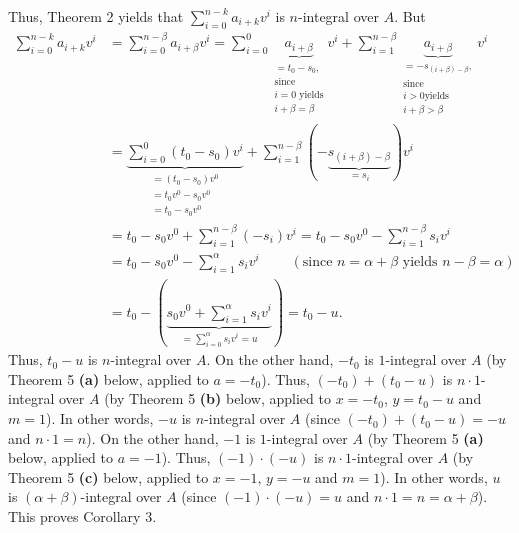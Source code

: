 \documentclass[12pt,final,notitlepage,onecolumn]{article}%
\begin{document}
Thus, Theorem 2 yields that $\sum\limits_{i=0}^{n-k}a_{i+k}v^{i}$ is
$n$-integral over $A$. But%
\begin{align*}
\sum\limits_{i=0}^{n-k}a_{i+k}v^{i}  &  =\sum\limits_{i=0}^{n-\beta}%
a_{i+\beta}v^{i}=\sum\limits_{i=0}^{0}\underbrace{a_{i+\beta}}%
_{\substack{=t_{0}-s_{0},\\\text{since}\\i=0\text{ yields}\\i+\beta=\beta
}}v^{i}+\sum\limits_{i=1}^{n-\beta}\underbrace{a_{i+\beta}}%
_{\substack{=-s_{\left(  i+\beta\right)  -\beta},\\\text{since}\\i>0\text{
yields}\\i+\beta>\beta}}v^{i}\\
&  =\underbrace{\sum\limits_{i=0}^{0}\left(  t_{0}-s_{0}\right)  v^{i}%
}_{\substack{=\left(  t_{0}-s_{0}\right)  v^{0}\\=t_{0}v^{0}-s_{0}%
v^{0}\\=t_{0}-s_{0}v^{0}}}+\sum\limits_{i=1}^{n-\beta}\left(  -\underbrace
{s_{\left(  i+\beta\right)  -\beta}}_{=s_{i}}\right)  v^{i}\\
&  =t_{0}-s_{0}v^{0}+\sum\limits_{i=1}^{n-\beta}\left(  -s_{i}\right)
v^{i}=t_{0}-s_{0}v^{0}-\sum\limits_{i=1}^{n-\beta}s_{i}v^{i}\\
&  =t_{0}-s_{0}v^{0}-\sum\limits_{i=1}^{\alpha}s_{i}v^{i}%
\ \ \ \ \ \ \ \ \ \ \left(  \text{since }n=\alpha+\beta\text{ yields }%
n-\beta=\alpha\right) \\
&  =t_{0}-\left(  \underbrace{s_{0}v^{0}+\sum\limits_{i=1}^{\alpha}s_{i}v^{i}%
}_{=\sum\limits_{i=0}^{\alpha}s_{i}v^{i}=u}\right)  =t_{0}-u.
\end{align*}
Thus, $t_{0}-u$ is $n$-integral over $A$. On the other hand, $-t_{0}$ is
$1$-integral over $A$ (by Theorem 5 \textbf{(a)} below, applied to $a=-t_{0}%
$). Thus, $\left(  -t_{0}\right)  +\left(  t_{0}-u\right)  $ is $n\cdot
1$-integral over $A$ (by Theorem 5 \textbf{(b)} below, applied to $x=-t_{0}$,
$y=t_{0}-u$ and $m=1$). In other words, $-u$ is $n$-integral over $A$ (since
$\left(  -t_{0}\right)  +\left(  t_{0}-u\right)  =-u$ and $n\cdot1=n$). On the
other hand, $-1$ is $1$-integral over $A$ (by Theorem 5 \textbf{(a)} below,
applied to $a=-1$). Thus, $\left(  -1\right)  \cdot\left(  -u\right)  $ is
$n\cdot1$-integral over $A$ (by Theorem 5 \textbf{(c)} below, applied to
$x=-1$, $y=-u$ and $m=1$). In other words, $u$ is $\left(  \alpha
+\beta\right)  $-integral over $A$ (since $\left(  -1\right)  \cdot\left(
-u\right)  =u$ and $n\cdot1=n=\alpha+\beta$). This proves Corollary 3.
\end{document}
